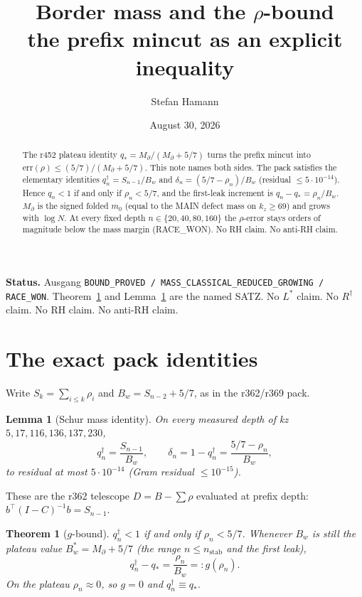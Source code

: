 \documentclass[11pt]{article}
\title{\bfseries Border mass and the $\rho$-bound\\[2mm]
\large the prefix mincut as an explicit inequality}
\author{Stefan Hamann}
\date{August 30, 2026}
\newtheorem{lemma}{Lemma}
\newtheorem{thm}{Theorem}
\begin{document}
\maketitle

\begin{abstract}\noindent
The r452 plateau identity
$q_*=M_\partial/(M_\partial+5/7)$
turns the prefix mincut into
$\mathrm{err}(\rho)\le(5/7)/(M_\partial+5/7)$.
This note names both sides.
The pack satisfies the elementary identities
$q_n^\dagger=S_{n-1}/B_w$ and
$\delta_n=(5/7-\rho_n)/B_w$
(residual $\le 5\cdot10^{-14}$).
Hence $q_n<1$ if and only if $\rho_n<5/7$,
and the first-leak increment is
$q_n-q_*=\rho_n/B_w$.
$M_\partial$ is the signed folded $m_0$
(equal to the MAIN defect mass on
$k_z\ge 69$) and grows with $\log N$.
At every fixed depth $n\in\{20,40,80,160\}$
the $\rho$-error stays orders of magnitude
below the mass margin (RACE\_WON).
No RH claim.  No anti-RH claim.
\end{abstract}

\medskip\noindent
\textbf{Status.}\enspace
Ausgang
\texttt{BOUND\_PROVED / MASS\_CLASSICAL\_REDUCED\_GROWING / RACE\_WON}.
Theorem~\ref{thm:g} and Lemma~\ref{lem:id} are the
named SATZ.  No $L^{*}$ claim.  No $R^{\dagger}$ claim.
No RH claim.  No anti-RH claim.

\section{The exact pack identities}\label{sec:id}

Write $S_k=\sum_{i\le k}\rho_i$ and
$B_w=S_{n-2}+5/7$, as in the r362/r369 pack.

\begin{lemma}[Schur mass identity]\label{lem:id}
On every measured depth of kz$5,17,116,136,137,230$,
\[
q_n^{\dagger}
=\frac{S_{n-1}}{B_w},
\qquad
\delta_n
=1-q_n^{\dagger}
=\frac{5/7-\rho_n}{B_w},
\]
to residual at most $5\cdot10^{-14}$
(Gram residual $\le10^{-15}$).
\end{lemma}

These are the r362 telescope
$D=B-\sum\rho$ evaluated at prefix depth:
$b^\top(I-C)^{-1}b=S_{n-1}$.

\begin{thm}[$g$-bound]\label{thm:g}
$q_n^{\dagger}<1$ if and only if
$\rho_n<5/7$.
Whenever $B_w$ is still the plateau value
$B_w^*=M_\partial+5/7$
(the range $n\le n_{\mathrm{stab}}$ and the
first leak),
\[
q_n^{\dagger}-q_*
=\frac{\rho_n}{B_w}
=:g(\rho_n).
\]
On the plateau $\rho_n\approx 0$, so
$g=0$ and $q_n^{\dagger}\equiv q_*$.
\end{thm}
\end{document}
